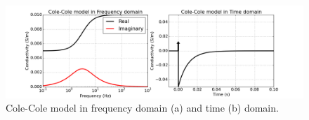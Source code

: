 \documentclass[a4paper, 11pt]{article}
\begin{document}
\begin{figure}
  \centering
  \includegraphics[width=1.0\textwidth]{figures/FDandTDCole.png}
  \caption{Cole-Cole model in frequency domain (a) and time (b) domain. }
  \label{Fig:FDandTDCole}
\end{figure}

\end{document}
